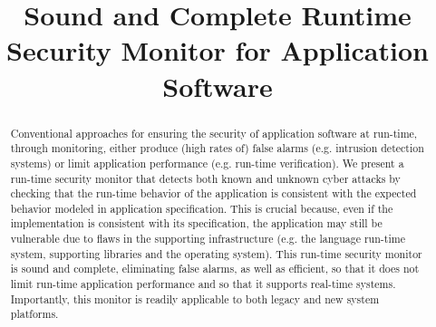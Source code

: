 \documentclass[conference]{IEEEtran}
\begin{document}
\title{Sound and Complete Runtime Security Monitor for Application Software}

\author{
\and
{}
\and
{}
}














\maketitle

\begin{abstract}
Conventional approaches for ensuring the security of application software at run-time, through monitoring, either produce (high rates 
of) false alarms (e.g. intrusion detection systems) or 
limit application performance (e.g. run-time verification). 
We present a run-time security monitor that detects both known and
unknown cyber attacks by checking that the run-time behavior of the
application is consistent with the expected behavior modeled in application specification. This is crucial because, even if the implementation is
consistent with its specification, the application may still be vulnerable
due to flaws in the supporting infrastructure (e.g. the language
run-time system, supporting libraries and the operating system). This run-time security monitor is sound and complete, eliminating false alarms, as well as efficient, so that it does not limit run-time application performance and so that it supports real-time systems. Importantly, this monitor is readily applicable to both legacy and new system platforms.


\end{abstract}
\end{document}
